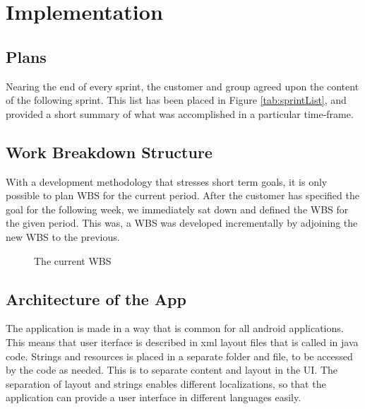 \chapter{Implementation}
\section{Plans}

Nearing the end of every sprint, the customer and group agreed upon the content of the following sprint. This list has been placed in Figure \ref{tab:sprintList}, and provided a short summary of what was accomplished in a particular time-frame. 

\section{Work Breakdown Structure}
With a development methodology that stresses short term goals, it is only possible to plan WBS for the current period. After the customer has specified the goal for the following week, we immediately sat down and defined the WBS for the given period. This was, a WBS was developed incrementally by adjoining the new WBS to the previous.
\begin{figure}[p]
\caption{The current WBS}
\setlength\fboxsep{0pt}
\setlength\fboxrule{1pt}
\end{figure}
\section{Architecture of the App}
The application is made in a way that is common for all android applications. This means that user iterface is described in xml layout files that is called in java code. Strings and resources is placed in a separate folder and file, to be accessed by the code as needed. This is to separate content and layout in the UI. The separation of layout and strings enables different localizations, so that the application can provide a user interface in different languages easily.

